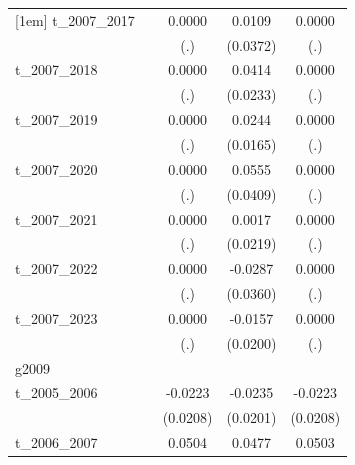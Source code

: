 \begin{table}[htbp]
\begin{tabular}{l*{4}{c}}
[1em]
t\_2007\_2017 &                     &      0.0000         &      0.0109         &      0.0000         \\
            &                     &         (.)         &    (0.0372)         &         (.)         \\
[1em]
t\_2007\_2018 &                     &      0.0000         &      0.0414\sym{*}  &      0.0000         \\
            &                     &         (.)         &    (0.0233)         &         (.)         \\
[1em]
t\_2007\_2019 &                     &      0.0000         &      0.0244         &      0.0000         \\
            &                     &         (.)         &    (0.0165)         &         (.)         \\
[1em]
t\_2007\_2020 &                     &      0.0000         &      0.0555         &      0.0000         \\
            &                     &         (.)         &    (0.0409)         &         (.)         \\
[1em]
t\_2007\_2021 &                     &      0.0000         &      0.0017         &      0.0000         \\
            &                     &         (.)         &    (0.0219)         &         (.)         \\
[1em]
t\_2007\_2022 &                     &      0.0000         &     -0.0287         &      0.0000         \\
            &                     &         (.)         &    (0.0360)         &         (.)         \\
[1em]
t\_2007\_2023 &                     &      0.0000         &     -0.0157         &      0.0000         \\
            &                     &         (.)         &    (0.0200)         &         (.)         \\
\hline
g2009       &                     &                     &                     &                     \\
t\_2005\_2006 &                     &     -0.0223         &     -0.0235         &     -0.0223         \\
            &                     &    (0.0208)         &    (0.0201)         &    (0.0208)         \\
[1em]
t\_2006\_2007 &                     &      0.0504\sym{**} &      0.0477\sym{*}  &      0.0503\sym{**} \\

\end{tabular}
\end{table}
